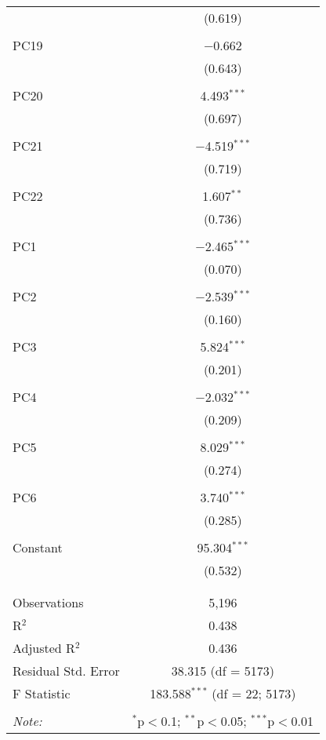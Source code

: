 \begin{table}[!htbp]
\begin{tabular}{@{\extracolsep{5pt}}lc}
  & (0.619) \\ 
  & \\ 
 PC19 & $-$0.662 \\ 
  & (0.643) \\ 
  & \\ 
 PC20 & 4.493$^{***}$ \\ 
  & (0.697) \\ 
  & \\ 
 PC21 & $-$4.519$^{***}$ \\ 
  & (0.719) \\ 
  & \\ 
 PC22 & 1.607$^{**}$ \\ 
  & (0.736) \\ 
  & \\ 
 PC1 & $-$2.465$^{***}$ \\ 
  & (0.070) \\ 
  & \\ 
 PC2 & $-$2.539$^{***}$ \\ 
  & (0.160) \\ 
  & \\ 
 PC3 & 5.824$^{***}$ \\ 
  & (0.201) \\ 
  & \\ 
 PC4 & $-$2.032$^{***}$ \\ 
  & (0.209) \\ 
  & \\ 
 PC5 & 8.029$^{***}$ \\ 
  & (0.274) \\ 
  & \\ 
 PC6 & 3.740$^{***}$ \\ 
  & (0.285) \\ 
  & \\ 
 Constant & 95.304$^{***}$ \\ 
  & (0.532) \\ 
  & \\ 
\hline \\[-1.8ex] 
Observations & 5,196 \\ 
R$^{2}$ & 0.438 \\ 
Adjusted R$^{2}$ & 0.436 \\ 
Residual Std. Error & 38.315 (df = 5173) \\ 
F Statistic & 183.588$^{***}$ (df = 22; 5173) \\ 
\hline 
\hline \\[-1.8ex] 
\textit{Note:}  & \multicolumn{1}{r}{$^{*}$p$<$0.1; $^{**}$p$<$0.05; $^{***}$p$<$0.01} \\ 
\end{tabular} 
\end{table} 

